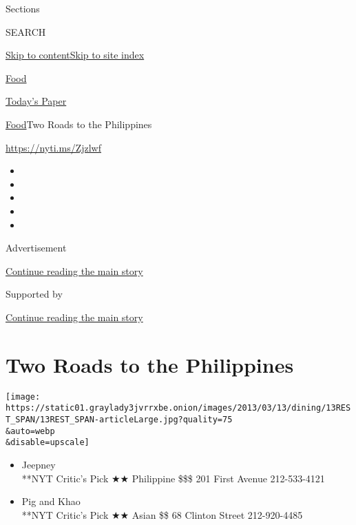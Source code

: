 Sections

SEARCH

\protect\hyperlink{site-content}{Skip to
content}\protect\hyperlink{site-index}{Skip to site index}

\href{https://www.nytimes3xbfgragh.onion/section/food}{Food}

\href{https://myaccount.nytimes3xbfgragh.onion/auth/login?response_type=cookie\&client_id=vi}{}

\href{https://www.nytimes3xbfgragh.onion/section/todayspaper}{Today's
Paper}

\href{/section/food}{Food}\textbar{}Two Roads to the Philippines

\url{https://nyti.ms/Zjzlwf}

\begin{itemize}
\item
\item
\item
\item
\item
\end{itemize}

Advertisement

\protect\hyperlink{after-top}{Continue reading the main story}

Supported by

\protect\hyperlink{after-sponsor}{Continue reading the main story}

\hypertarget{two-roads-to-the-philippines}{%
\section{Two Roads to the
Philippines}\label{two-roads-to-the-philippines}}

\texttt{[image: https://static01.graylady3jvrrxbe.onion/images/2013/03/13/dining/13REST\_SPAN/13REST\_SPAN-articleLarge.jpg?quality=75\\\&auto=webp\\\&disable=upscale]}

\begin{itemize}
\tightlist
\item
  Jeepney\\
  **NYT Critic's Pick ★★ Philippine \$\$\$ 201 First Avenue 212-533-4121
\end{itemize}

\begin{itemize}
\tightlist
\item
  Pig and Khao\\
  **NYT Critic's Pick ★★ Asian \$\$ 68 Clinton Street 212-920-4485
\end{itemize}

